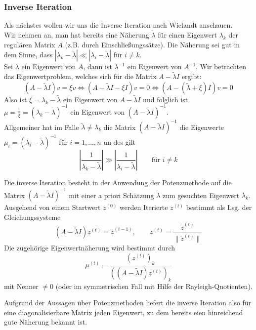\subsubsection{Inverse Iteration} 
Als nächstes wollen wir uns die \glqq{}Inverse Iteration\grqq{} nach
Wielandt anschauen. \\
Wir nehmen an, man hat bereits eine Näherung $\tilde{\lambda}$ für einen Eigenwert $\lambda_k$ der regulären Matrix 
$A$ (z.B. durch Einschließungssätze). Die Näherung sei gut in dem Sinne, 
dass $|\lambda_k-\tilde{\lambda}|\ll |\lambda_i-\tilde{\lambda}|$ für $i\neq k$.\\
Sei $\lambda$ ein Eigenwert von $A$, dann ist $\lambda^{-1}$ ein Eigenwert von $A^{-1}$. 
Wir betrachten das Eigenwertproblem, welches sich für die Matrix $A-\tilde{\lambda}I$ ergibt:
\[(A-\tilde{\lambda}I)v=\xi v \iff (A-\tilde{\lambda}I-\xi I)v = 0 \iff (A-(\tilde{\lambda}+\xi)I)v=0\]
Also ist $\xi=\lambda_k-\tilde{\lambda}$ ein Eigenwert von $A-\tilde{\lambda}I$ und folglich ist 
$\mu=\tfrac{1}{\xi}=(\lambda_k-\tilde{\lambda})^{-1}$ ein Eigenwert von $(A-\tilde{\lambda}I)^{-1}$. \\
Allgemeiner hat im Falle $\tilde{\lambda}\neq\lambda_k$ die Matrix $(A-\tilde{\lambda}I)^{-1}$ die Eigenwerte 
$\mu_i = (\lambda_i-\tilde{\lambda})^{-1}$ für $i=1,\dotsc,n$ un des gilt 
\[\left|\dfrac{1}{\lambda_k-\tilde{\lambda}}\right| \gg \left|\dfrac{1}{\lambda_i-\tilde{\lambda}}\right|\qquad 
\text{für } i\neq k\]
\begin{defbox}
    Die inverse Iteration besteht in der Anwendung der Potenzmethode auf die Matrix $(A-\tilde{\lambda}I)^{-1}$
    mit einer a priori Schätzung $\tilde{\lambda}$ zum gesuchten Eigenwert $\lambda_k$. \\ 
    Ausgehend von einem Startwert $z^{(0)}$ werden Iterierte $z^{(t)}$ bestimmt als Lsg. der Gleichungssysteme
    \[(A-\tilde{\lambda}I)z^{(t)} = \tilde{z}^{(t-1)},
    \qquad z^{(t)} = \dfrac{\tilde{z}^{(t)}}{\|\tilde{z}^{(t)}\|}\]
    Die zugehörige Eigenwertnäherung wird bestimmt durch 
    \[\mu^{(t)}=\dfrac{(z^{(t)})_k}{((A-\tilde{\lambda}I)z^{(t)})_k}\]
    mit Nenner $\neq 0$ (oder im symmetrischen Fall mit Hilfe der Rayleigh-Quotienten).
\end{defbox}
Aufgrund der Aussagen über Potenzmethoden liefert die inverse Iteration also für eine diagonalisierbare Matrix
jeden Eigenwert, zu dem bereits eien hinreichend gute Näherung bekannt ist.
